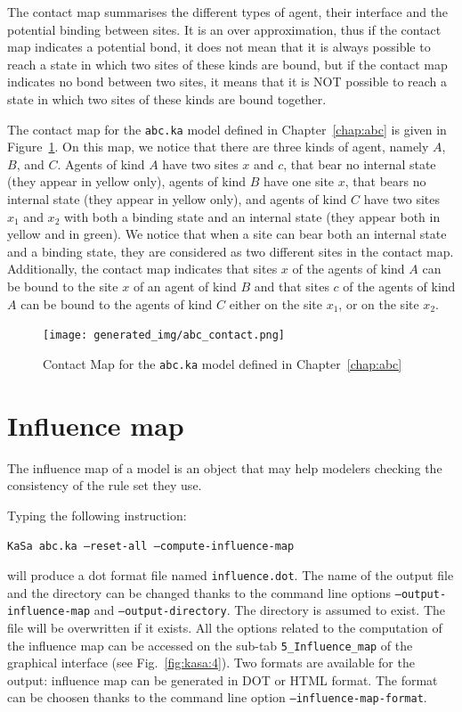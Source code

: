 \documentclass[11pt]{book}
\def\ttt#1{\texttt{#1}}
\begin{document}
The contact map summarises the different types of agent, their interface and the potential binding between sites. It is an over approximation, thus if the contact map indicates a potential bond, it does not mean that it is always possible to reach a state in which two sites of these kinds are bound, but if the contact map indicates no bond between two sites, it means that it is NOT possible to reach a state in which two sites of these kinds are bound together.


The contact map for the \ttt{abc.ka} model  defined in Chapter~\ref{chap:abc} is given in Figure~\ref{fig:abc-contact}. On this map, we notice that there are three kinds of agent, namely $A$, $B$, and $C$.
Agents of kind $A$ have two sites $x$ and $c$, that bear no internal state (they appear in yellow only), agents of kind $B$ have one site $x$, that bears no internal state (they appear in yellow only), and agents of kind $C$ have two sites $x_1$ and $x_2$ with both a binding state and an internal state (they appear both in yellow and in green). We notice that when a site can bear both an internal state and a binding state, they are considered as two different sites in the contact map. Additionally, the contact map indicates that sites $x$ of the agents of kind $A$ can be bound to the site $x$ of an agent of kind $B$ and that sites $c$ of the agents of kind $A$ can be bound to the agents of kind $C$ either on the site $x_1$, or on the site $x_2$.

\begin{figure}[htbp]
\centering
\texttt{[image: generated\_img/abc\_contact.png]}
\caption{Contact Map for the \ttt{abc.ka} model defined in Chapter~\ref{chap:abc}}
\label{fig:abc-contact}
\end{figure}



\section{Influence map}

The influence map of a model is an object that may help modelers checking the consistency of the rule set they use.

Typing the following instruction:

\texttt{KaSa abc.ka --reset-all --compute-influence-map}

will produce a dot format file named \texttt{influence.dot}.
The name of the output file and the directory can be changed thanks to the command line options \texttt{--output-influence-map} and \texttt{--output-directory}.
The directory is assumed to exist. The file will be overwritten if it exists.  All the options related to the computation of the influence map can be accessed on the sub-tab \texttt{5\_Influence\_map} of the graphical interface (see Fig.~\ref{fig:kasa:4}). Two formats are available for the output: influence map can be generated in DOT or HTML format. The format can be choosen thanks to the command line option \texttt{--influence-map-format}.
\end{document}
